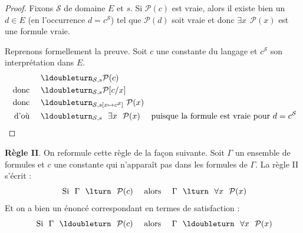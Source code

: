 \documentclass[11pt,class=report,crop=false]{standalone}
\begin{document}
\begin{proof}
	Fixons $\mathcal{S}$ de domaine $E$ et $s$. Si $\mathcal{P}(c)$ est vraie, alors il existe bien un $d \in E$ (en l'occurrence $d = c^{\mathcal{S}}$) tel que $\mathcal{P}(d)$ soit vraie et donc \og{}$\exists x \ \ \mathcal{P}(x)$\fg{} est une formule vraie.
	
Reprenons formellement la preuve.
Soit $c$ une constante du langage et $c^{\mathcal{S}}$ son interprétation dans $E$.
\begin{align*}
							& \ldoubleturn_{\mathcal{S},s} \mathcal{P}(c) \\
	\text{ donc }  \quad   	& \ldoubleturn_{\mathcal{S},s} \mathcal{P}[c/x] \\
	\text{ donc }  \quad    & \ldoubleturn_{\mathcal{S},s[x \mapsto c^{\mathcal{S}}]} \ \mathcal{P}(x) \\
	\text{ d'où }  \quad   	& \ldoubleturn_{\mathcal{S},s} \ \  \exists x \ \ \mathcal{P}(x)\quad \text{ puisque la formule est vraie pour $d = c^{\mathcal{S}}$}
\end{align*} 		
	
\end{proof}


\medskip

\textbf{Règle II}. On reformule cette règle de la façon suivante. Soit $\Gamma$ un ensemble de formules et $c$ une constante qui n'apparaît pas dans les formules de $\Gamma$. La règle II s'écrit :
\[
\text{ Si } \ \Gamma \ \ \lturn \ \ \mathcal{P}(c)  \quad 
\text{ alors } \quad \Gamma \ \ \lturn \ \ \forall x \ \ \mathcal{P}(x)
\]
Et on a bien un énoncé correspondant en termes de satisfaction :
\[
\text{ Si } \ \Gamma \ \ \ldoubleturn \ \ \mathcal{P}(c)  \quad 
\text{ alors } \quad \Gamma \ \ \ldoubleturn \ \ \forall x \ \ \mathcal{P}(x)
\]
\end{document}
